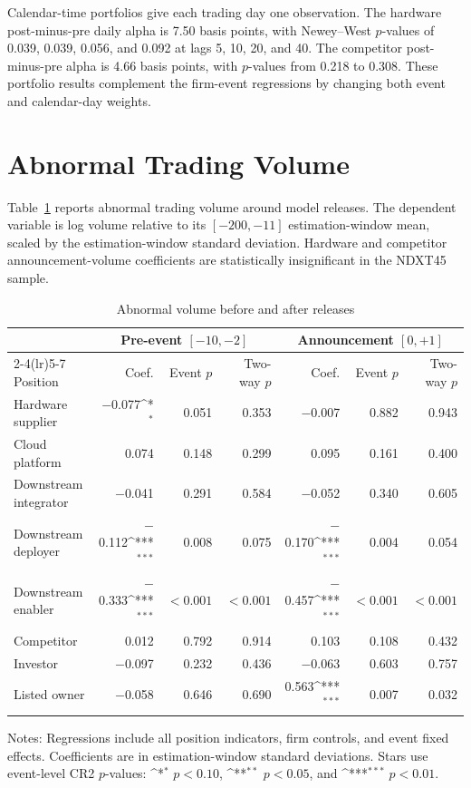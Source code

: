\documentclass[12pt]{article}
\newcommand{\sym}[1]{\ifmmode^{#1}\else\(^{#1}\)\fi}
\begin{document}
Calendar-time portfolios give each trading day one observation. The
hardware post-minus-pre daily alpha is 7.50 basis points, with Newey--West
$p$-values of 0.039, 0.039, 0.056, and 0.092 at lags 5, 10, 20, and 40.
The competitor post-minus-pre alpha is 4.66 basis points, with $p$-values
from 0.218 to 0.308. These portfolio results complement the firm-event
regressions by changing both event and calendar-day weights.

\section{Abnormal Trading Volume}

Table~\ref{tab:a8} reports abnormal trading volume around model releases.
The dependent variable is log volume relative to its
$[-200,-11]$ estimation-window mean, scaled by the estimation-window
standard deviation. Hardware and competitor announcement-volume
coefficients are statistically insignificant in the NDXT45 sample.

\begin{table}[H]
\centering
\begin{threeparttable}
\caption{Abnormal volume before and after releases}\label{tab:a8}
\scriptsize
\setlength{\tabcolsep}{2.8pt}
\begin{tabular}{lrrrrrr}
\toprule
& \multicolumn{3}{c}{Pre-event $[-10,-2]$}
& \multicolumn{3}{c}{Announcement $[0,+1]$} \\
\cmidrule(lr){2-4}\cmidrule(lr){5-7}
Position & Coef. & Event $p$ & Two-way $p$ &
Coef. & Event $p$ & Two-way $p$ \\
\midrule
Hardware supplier      & $-$0.077\sym{*} & 0.051 & 0.353 & $-$0.007 & 0.882 & 0.943 \\
Cloud platform         & 0.074 & 0.148 & 0.299 & 0.095 & 0.161 & 0.400 \\
Downstream integrator  & $-$0.041 & 0.291 & 0.584 & $-$0.052 & 0.340 & 0.605 \\
Downstream deployer    & $-$0.112\sym{***} & 0.008 & 0.075 & $-$0.170\sym{***} & 0.004 & 0.054 \\
Downstream enabler     & $-$0.333\sym{***} & $<0.001$ & $<0.001$ & $-$0.457\sym{***} & $<0.001$ & $<0.001$ \\
Competitor             & 0.012 & 0.792 & 0.914 & 0.103 & 0.108 & 0.432 \\
Investor               & $-$0.097 & 0.232 & 0.436 & $-$0.063 & 0.603 & 0.757 \\
Listed owner           & $-$0.058 & 0.646 & 0.690 & 0.563\sym{***} & 0.007 & 0.032 \\
\bottomrule
\end{tabular}
\begin{tablenotes}\footnotesize
\item Notes: Regressions include all position indicators, firm controls,
and event fixed effects. Coefficients are in estimation-window standard
deviations.
Stars use event-level CR2 $p$-values:
\sym{*} $p<0.10$, \sym{**} $p<0.05$, and \sym{***} $p<0.01$.
\end{tablenotes}
\end{threeparttable}
\end{table}
\end{document}

